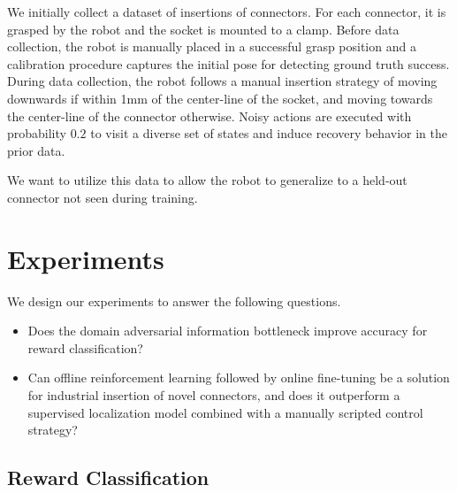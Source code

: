 We initially collect a dataset of insertions of \numconnectors{} connectors. For each connector, it is grasped by the robot and the socket is mounted to a clamp. Before data collection, the robot is manually placed in a successful grasp position and a calibration procedure captures the initial pose for detecting ground truth success. During data collection, the robot follows a manual insertion strategy of moving downwards if within 1mm of the center-line of the socket, and moving towards the center-line of the connector otherwise. Noisy actions are executed with probability $0.2$ to visit a diverse set of states and induce recovery behavior in the prior data.

We want to utilize this data to allow the robot to generalize to a held-out connector not seen during training.


\section{Experiments}







We design our experiments to answer the following questions.
\begin{itemize}
    \item Does the domain adversarial information bottleneck improve accuracy for reward classification?
    \item Can offline reinforcement learning followed by online fine-tuning be a solution for industrial insertion of novel connectors, and does it outperform a supervised localization model combined with a manually scripted control strategy?
\end{itemize}

\subsection{Reward Classification}

